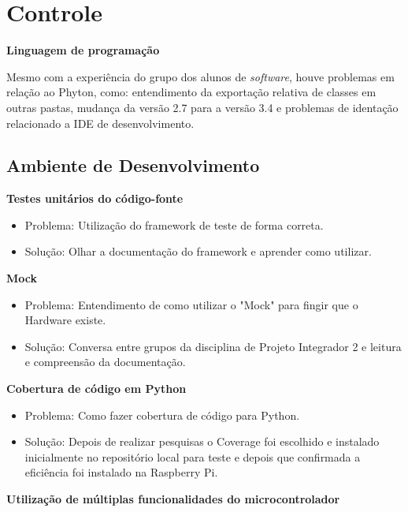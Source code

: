 \section{Controle}

  \textbf{Linguagem de programação}

    Mesmo com a experiência do grupo dos alunos de \textit{software}, houve problemas em relação ao Phyton, como: entendimento da exportação relativa de classes em outras pastas, mudança da versão 2.7 para a versão 3.4 e problemas de identação relacionado a IDE de desenvolvimento.

\subsection{Ambiente de Desenvolvimento}

\textbf{Testes unitários do código-fonte}

    \begin{itemize}
    \item Problema: Utilização do framework de teste de forma correta.
    \item Solução: Olhar a documentação do framework e aprender como utilizar.

    \end{itemize}

\textbf{Mock}

 \begin{itemize}
    \item Problema: Entendimento de como utilizar o "Mock" para fingir que o Hardware existe.
    \item Solução: Conversa entre grupos da disciplina de Projeto Integrador 2 e leitura e compreensão da documentação.

    \end{itemize}

\textbf{Cobertura de código em Python}

 \begin{itemize}
    \item Problema: Como fazer cobertura de código para Python.
    \item Solução: Depois de realizar pesquisas o Coverage foi escolhido e instalado inicialmente no repositório local para teste e depois que confirmada a eficiência foi instalado na Raspberry Pi.
    \end{itemize}

\textbf{Utilização de múltiplas funcionalidades do microcontrolador}

